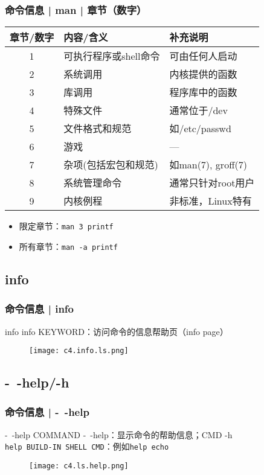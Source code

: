 \begin{frame}[fragile]
  \frametitle{命令信息 | man | 章节（数字）}
  \begin{table}
    \centering
    \begin{tabular}{cll}
      \hline
      \rowcolor{blue!50}章节/数字 & 内容/含义 & 补充说明\\
      \hline
      1 & 可执行程序或shell命令 & 可由任何人启动 \\
      2 & 系统调用 & 内核提供的函数\\
      3 & 库调用 & 程序库中的函数\\
      4 & 特殊文件 & 通常位于/dev\\
      5 & 文件格式和规范 & 如/etc/passwd\\
      6 & 游戏 & ---\\
      7 & 杂项(包括宏包和规范) & 如man(7), groff(7)\\
      8 & 系统管理命令 & 通常只针对root用户\\
      9 & 内核例程 & 非标准，Linux特有\\
      \hline
    \end{tabular}
  \end{table}
  \pause
  \begin{itemize}
    \item 限定章节：\verb|man 3 printf|
    \item 所有章节：\verb|man -a printf|
  \end{itemize}
\end{frame}

\subsection{info}
\begin{frame}
  \frametitle{命令信息 | info}
  \begin{block}{info}
    info KEYWORD：访问命令的信息帮助页（info page）
  \end{block}
  \begin{figure}
    \centering
    \texttt{[image: c4.info.ls.png]}
  \end{figure}
\end{frame}

\subsection{-\ -help/-h}
\begin{frame}[fragile]
  \frametitle{命令信息 | -\ -help}
  \begin{block}{-\ -help}
    \alert{COMMAND -\ -help}：显示命令的帮助信息；\alert{CMD -h}\\
    \verb|help BUILD-IN SHELL CMD|：例如\verb|help echo|
  \end{block}
  \vspace{-0.2cm}
  \begin{figure}
    \centering
    \texttt{[image: c4.ls.help.png]}
  \end{figure}
\end{frame}

